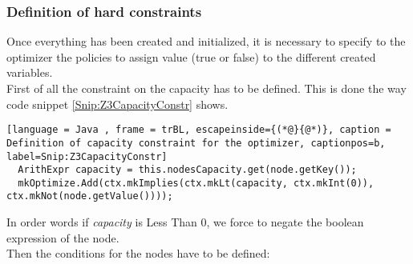 \subsubsection{Definition of hard constraints}
Once everything has been created and initialized, it is necessary to specify to the optimizer the policies to assign value (true or false) to the different created variables.\\
First of all the constraint on the capacity has to be defined. This is done the way code snippet \ref{Snip:Z3CapacityConstr} shows.
\begin{lstlisting}[language = Java , frame = trBL, escapeinside={(*@}{@*)}, caption = Definition of capacity constraint for the optimizer, captionpos=b, label=Snip:Z3CapacityConstr]
  ArithExpr capacity = this.nodesCapacity.get(node.getKey());
  mkOptimize.Add(ctx.mkImplies(ctx.mkLt(capacity, ctx.mkInt(0)), ctx.mkNot(node.getValue())));
\end{lstlisting}
In order words if \textit{capacity} is Less Than 0, we force to negate the boolean expression of the node.\\
Then the conditions for the nodes have to be defined:

